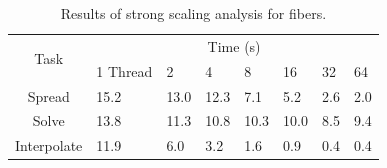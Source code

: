 \documentclass[]{article}
\begin{document}
\begin{table}
\centering
\begin{tabular}{|c||l|l|l|l|l|l|l|}
	\hline
	\multirow{2}{*}{Task} 
	& \multicolumn{7}{c|}{Time (s)}  \\
	& 1 Thread & 2 & 4 & 8 & 16 & 32 & 64\\  \hline
	Spread & 15.2 & 13.0 & 12.3  & 7.1 & 5.2 & 2.6 & 2.0\\      \hline
	Solve & 13.8 & 11.3  & 10.8  & 10.3 & 10.0 & 8.5 & 9.4\\      \hline
	Interpolate & 11.9 & 6.0 & 3.2 & 1.6 & 0.9 & 0.4 & 0.4\\  \hline
\end{tabular}
\caption{Results of strong scaling analysis for fibers.}
\label{tab:fibsc}
\end{table}
\fi


\newpage



\end{document}
